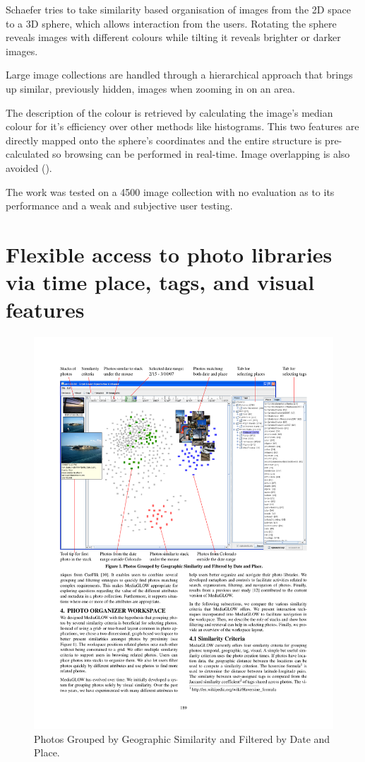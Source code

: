 Schaefer \cite{Schaefer:2010p1871} tries to take similarity based organisation of images from the 2D space to a 3D sphere, which allows interaction from the users. Rotating the sphere reveals images with different colours while tilting it reveals brighter or darker images.

Large image collections are handled through a hierarchical approach that brings up similar, previously hidden, images when zooming in on an area.

The description of the colour is retrieved by calculating the image's median colour for it's efficiency over other methods like histograms. This two features are directly mapped onto the sphere's coordinates and the entire structure is pre-calculated so browsing can be performed in real-time. Image overlapping is also avoided ().

The work was tested on a 4500 image collection with no evaluation as to its performance and a weak and subjective user testing.



\section{Flexible access to photo libraries via time place, tags, and visual features} %
\label{sub:Girgensohn}
\begin{figure}[ht]
	\centering
		\includegraphics[width=\textwidth]{imgs-RelatedWork/Girgensohn1.pdf}
	\caption{Photos Grouped by Geographic Similarity and Filtered by Date and Place.}
	\label{fig:girgensohn}
\end{figure}

